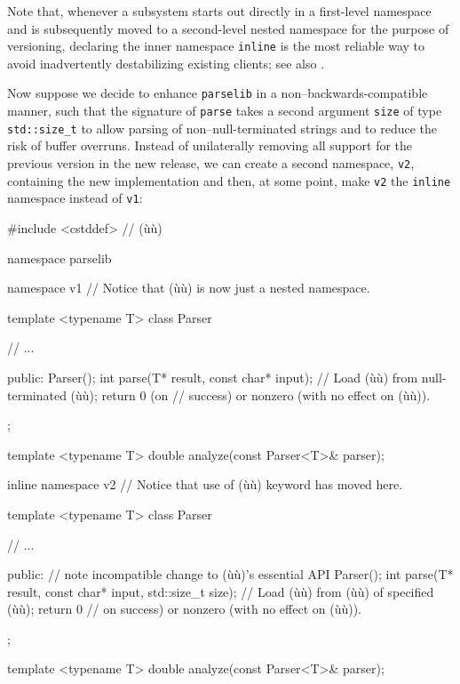 Note that, whenever a subsystem starts out directly in a first-level
namespace and is subsequently moved to a second-level nested namespace
for the purpose of versioning, declaring the inner namespace
\lstinline!inline! is the most reliable way to avoid inadvertently
destabilizing existing clients; see also .  

Now suppose we decide to enhance \lstinline!parselib! in a
non--backwards-compatible manner, such that the signature of
\lstinline!parse! takes a second argument \lstinline!size! of type
\lstinline!std::size_t! to allow parsing of non--null-terminated strings
and to reduce the risk of buffer overruns. Instead of unilaterally
removing all support for the previous version in the new release, we can
create a second namespace, \lstinline!v2!, containing the new
implementation and then, at some point, make \lstinline!v2! the
\lstinline!inline! namespace instead of \lstinline!v1!:

\begin{emcppslisting}
#include <cstddef>  // (ù{}ù)

namespace parselib
{
    namespace v1  // Notice that (ù{}ù) is now just a nested namespace.
    {
        template <typename T>
        class Parser
        {
            // ...

        public:
            Parser();
            int parse(T* result, const char* input);
                // Load (ù{}ù) from null-terminated (ù{}ù); return 0 (on
                // success) or nonzero (with no effect on (ù{}ù)).
        };

        template <typename T>
        double analyze(const Parser<T>& parser);
    }

    inline namespace v2    // Notice that use of (ù{}ù) keyword has moved here.
    {
        template <typename T>
        class Parser
        {
            // ...

        public:  // note incompatible change to (ù{}ù)'s essential API
            Parser();
            int parse(T* result, const char* input, std::size_t size);
                // Load (ù{}ù) from (ù{}ù) of specified (ù{}ù); return 0
                // on success) or nonzero (with no effect on (ù{}ù)).
        };

        template <typename T>
        double analyze(const Parser<T>& parser);
    }
}
\end{emcppslisting}
    
